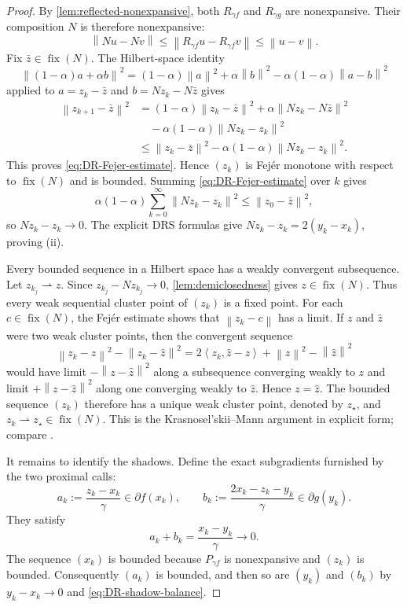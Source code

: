 \documentclass[10pt,leqno]{amsart}
\numberwithin{equation}{section}
\numberwithin{algorithm}{section}
\theoremstyle{remark}
\newcommand{\Fix}{\operatorname{fix}}
\newcommand{\subd}{\partial}
\newcommand{\norm}[1]{\left\lVert #1 \right\rVert}
\newcommand{\ip}[2]{\left\langle #1,#2 \right\rangle}
\begin{document}
\begin{proof}
By \cref{lem:reflected-nonexpansive}, both $R_{\gamma f}$ and
$R_{\gamma g}$ are nonexpansive.  Their composition $N$ is therefore nonexpansive:
\[
  \norm{Nu-Nv}
  \le\norm{R_{\gamma f}u-R_{\gamma f}v}
  \le\norm{u-v}.
\]
Fix $\bar z\in\Fix(N)$.  The Hilbert-space identity
\[
  \norm{(1-\alpha)a+\alpha b}^2
  =(1-\alpha)\norm a^2+\alpha\norm b^2
   -\alpha(1-\alpha)\norm{a-b}^2
\]
applied to $a=z_k-\bar z$ and $b=Nz_k-N\bar z$ gives
\begin{align*}
  \norm{z_{k+1}-\bar z}^2
  &=(1-\alpha)\norm{z_k-\bar z}^2
    +\alpha\norm{Nz_k-N\bar z}^2\\
  &\quad
    -\alpha(1-\alpha)\norm{Nz_k-z_k}^2\\
  &\le\norm{z_k-\bar z}^2
    -\alpha(1-\alpha)\norm{Nz_k-z_k}^2.
\end{align*}
This proves \eqref{eq:DR-Fejer-estimate}.  Hence $(z_k)$ is Fej\'er monotone with respect to $\Fix(N)$ and is bounded.  Summing \eqref{eq:DR-Fejer-estimate} over $k$ gives
\[
  \alpha(1-\alpha)
  \sum_{k=0}^{\infty}\norm{Nz_k-z_k}^2
  \le\norm{z_0-\bar z}^2,
\]
so $Nz_k-z_k\to0$.  The explicit DRS formulas give
$Nz_k-z_k=2(y_k-x_k)$, proving (ii).

Every bounded sequence in a Hilbert space has a weakly convergent subsequence.  Let $z_{k_j}\rightharpoonup z$.  Since
$z_{k_j}-Nz_{k_j}\to0$, \cref{lem:demiclosedness} gives $z\in\Fix(N)$.  Thus every weak sequential cluster point of $(z_k)$ is a fixed point.
For each $c\in\Fix(N)$, the Fej\'er estimate shows that
$\norm{z_k-c}$ has a limit.  If $z$ and $\widehat z$ were two weak cluster points, then the convergent sequence
\[
  \norm{z_k-z}^2-\norm{z_k-\widehat z}^2
  =2\ip{z_k}{\widehat z-z}+\norm z^2-\norm{\widehat z}^2
\]
would have limit $-\norm{z-\widehat z}^2$ along a subsequence converging weakly to $z$ and limit $+\norm{z-\widehat z}^2$ along one converging weakly to $\widehat z$.  Hence $z=\widehat z$.  The bounded sequence $(z_k)$ therefore has a unique weak cluster point, denoted by $z_\star$, and $z_k\rightharpoonup z_\star\in\Fix(N)$.  This is the Krasnosel'skii--Mann argument in explicit form; compare \cite[Thm.~5.15]{BauschkeCombettes2017}.

It remains to identify the shadows.  Define the exact subgradients furnished by the two proximal calls:
\begin{equation}
\label{eq:DR-shadow-graph-pairs}
  a_k:=\frac{z_k-x_k}{\gamma}\in\subd f(x_k),
  \qquad
  b_k:=\frac{2x_k-z_k-y_k}{\gamma}\in\subd g(y_k).
\end{equation}
They satisfy
\begin{equation}
\label{eq:DR-shadow-balance}
  a_k+b_k=\frac{x_k-y_k}{\gamma}\longrightarrow0.
\end{equation}
The sequence $(x_k)$ is bounded because $P_{\gamma f}$ is nonexpansive and $(z_k)$ is bounded.  Consequently $(a_k)$ is bounded, and then so are $(y_k)$ and $(b_k)$ by
$y_k-x_k\to0$ and \eqref{eq:DR-shadow-balance}.


\end{proof}
\end{document}
